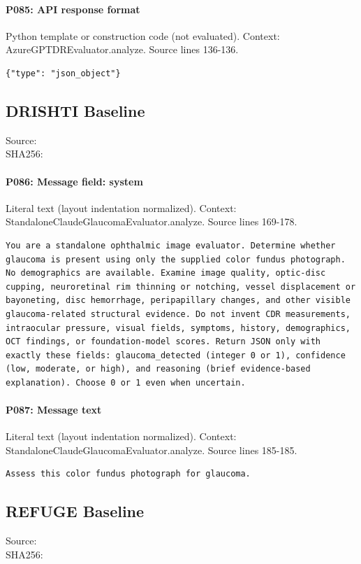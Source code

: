 \documentclass[10pt]{article}
\begin{document}
\paragraph{P085: API response format}
Python template or construction code (not evaluated). Context: AzureGPTDREvaluator.analyze. Source lines 136-136.
\begin{Verbatim}
{"type": "json_object"}
\end{Verbatim}
\subsection{DRISHTI Baseline}
Source: \\
SHA256: {\scriptsize{}}
\paragraph{P086: Message field: system}
Literal text (layout indentation normalized). Context: StandaloneClaudeGlaucomaEvaluator.analyze. Source lines 169-178.
\begin{Verbatim}
You are a standalone ophthalmic image evaluator. Determine whether glaucoma is present using only the supplied color fundus photograph. No demographics are available. Examine image quality, optic-disc cupping, neuroretinal rim thinning or notching, vessel displacement or bayoneting, disc hemorrhage, peripapillary changes, and other visible glaucoma-related structural evidence. Do not invent CDR measurements, intraocular pressure, visual fields, symptoms, history, demographics, OCT findings, or foundation-model scores. Return JSON only with exactly these fields: glaucoma_detected (integer 0 or 1), confidence (low, moderate, or high), and reasoning (brief evidence-based explanation). Choose 0 or 1 even when uncertain.
\end{Verbatim}
\paragraph{P087: Message text}
Literal text (layout indentation normalized). Context: StandaloneClaudeGlaucomaEvaluator.analyze. Source lines 185-185.
\begin{Verbatim}
Assess this color fundus photograph for glaucoma.
\end{Verbatim}
\subsection{REFUGE Baseline}
Source: \\
SHA256: {\scriptsize{}}
\end{document}

